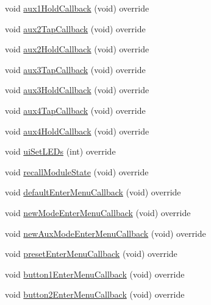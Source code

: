 \begin{DoxyCompactItemize}
void \mbox{\hyperlink{class_via_meta_1_1_via_meta_u_i_a1c38639df8fdb4a866622388548bc9db}{aux1\+Hold\+Callback}} (void) override
\item 
void \mbox{\hyperlink{class_via_meta_1_1_via_meta_u_i_a2d1e0164ad7d84c410cc90cefe9730ce}{aux2\+Tap\+Callback}} (void) override
\item 
void \mbox{\hyperlink{class_via_meta_1_1_via_meta_u_i_a19cac5da8e89446d5ee2a2c889a6c555}{aux2\+Hold\+Callback}} (void) override
\item 
void \mbox{\hyperlink{class_via_meta_1_1_via_meta_u_i_a4f9a282e24dd484d24657a1568defd75}{aux3\+Tap\+Callback}} (void) override
\item 
void \mbox{\hyperlink{class_via_meta_1_1_via_meta_u_i_ad15168253fc76c7a938ca467ada12ade}{aux3\+Hold\+Callback}} (void) override
\item 
void \mbox{\hyperlink{class_via_meta_1_1_via_meta_u_i_ad8e6300990d654091672b0f94a9b47d8}{aux4\+Tap\+Callback}} (void) override
\item 
void \mbox{\hyperlink{class_via_meta_1_1_via_meta_u_i_a2a1cfb3452d150af61f61716aa94f782}{aux4\+Hold\+Callback}} (void) override
\item 
void \mbox{\hyperlink{class_via_meta_1_1_via_meta_u_i_a54f7dbc780758a9842836a9cdd3239a0}{ui\+Set\+L\+E\+Ds}} (int) override
\item 
void \mbox{\hyperlink{class_via_meta_1_1_via_meta_u_i_a40b2c4c2139c78f273d923fdb0d3f4ce}{recall\+Module\+State}} (void) override
\item 
void \mbox{\hyperlink{class_via_meta_1_1_via_meta_u_i_a632c291b811cf6e704e913060083dd7d}{default\+Enter\+Menu\+Callback}} (void) override
\item 
void \mbox{\hyperlink{class_via_meta_1_1_via_meta_u_i_a6adf1a02d1e513a13727982347ecbe72}{new\+Mode\+Enter\+Menu\+Callback}} (void) override
\item 
void \mbox{\hyperlink{class_via_meta_1_1_via_meta_u_i_a5a1034beff03b3c5cdc12a9b3a7d0834}{new\+Aux\+Mode\+Enter\+Menu\+Callback}} (void) override
\item 
void \mbox{\hyperlink{class_via_meta_1_1_via_meta_u_i_a21cd6b42537b8abe34cfe65258455991}{preset\+Enter\+Menu\+Callback}} (void) override
\item 
void \mbox{\hyperlink{class_via_meta_1_1_via_meta_u_i_a5e9d82c9c06759dd2cc3b48846e594f2}{button1\+Enter\+Menu\+Callback}} (void) override
\item 
void \mbox{\hyperlink{class_via_meta_1_1_via_meta_u_i_a5687d94232ddf1b109a5f48c8ef89650}{button2\+Enter\+Menu\+Callback}} (void) override

\end{DoxyCompactItemize}
